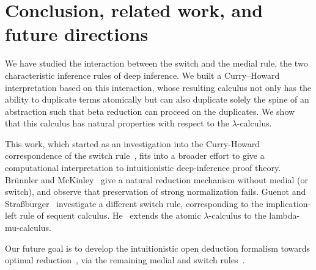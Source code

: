 \documentclass[runningheads]{llncs}
\begin{document}
\section{Conclusion, related work, and future directions}
\label{chap:conc}



We have studied the interaction between the switch and the medial rule, the two characteristic inference rules of deep inference. We built a Curry--Howard interpretation based on this interaction, whose resulting calculus not only has the ability to duplicate terms atomically but can also duplicate solely the spine of an abstraction such that beta reduction can proceed on the duplicates. We show that this calculus has natural properties with respect to the $\lambda$-calculus.

This work, which started as an investigation into the Curry-Howard correspondence of the switch rule~\cite{sherratt2019atomic}, fits into a broader effort to give a computational interpretation to intuitionistic deep-inference proof theory. Br\"unnler and McKinley~\cite{Brunnler-McKinley-2008} give a natural reduction mechanism without medial (or switch), and observe that preservation of strong normalization fails. Guenot and Stra\ss burger~\cite{Guenot-Strassburger-2014} investigate a different switch rule, corresponding to the implication-left rule of sequent calculus. He~\cite{He-2018} extends the atomic $\lambda$-calculus to the lambda-mu-calculus. 

Our future goal is to develop the intuitionistic open deduction formalism towards optimal reduction~\cite{Levy-1980,Lamping-1990,Asperti-Guerrini-1998}, via the remaining medial and switch rules~\cite{Tiu-2006}.

%
%
%


%
\end{document}
